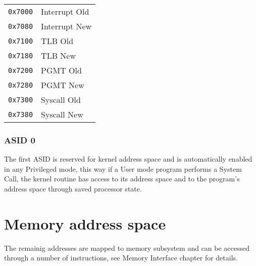 \begin{tabular}{r|l}
\texttt{0x7000} & Interrupt Old \\
\texttt{0x7080} & Interrupt New \\
\texttt{0x7100} & TLB Old \\
\texttt{0x7180} & TLB New \\
\texttt{0x7200} & PGMT Old \\
\texttt{0x7280} & PGMT New \\
\texttt{0x7300} & Syscall Old \\
\texttt{0x7380} & Syscall New \\
\end{tabular}

\subsubsection{ASID 0}
The first ASID is reserved for kernel address space and is automatically enabled in any Privileged mode, this way if a User mode program performs a System Call, the kernel routine has access to its address space and to the program's address space through saved processor state.

\section{Memory address space}

The remainig addresses are mapped to memory subsystem and can be accessed through a number of instructions, see Memory Interface chapter for details.
